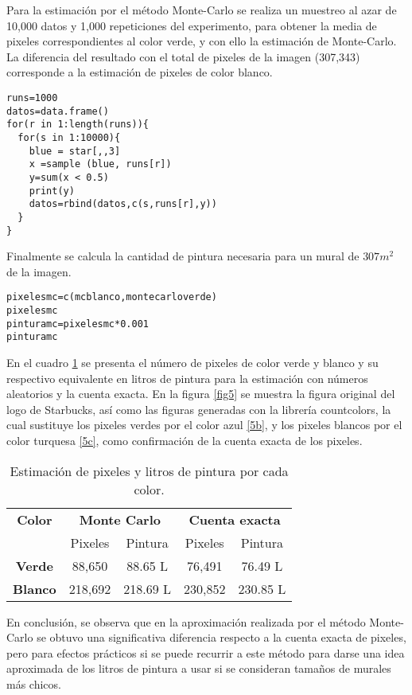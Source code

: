 \documentclass[12pt]{amsart}
\begin{document}
\newpage
Para la estimación por el método Monte-Carlo se realiza un muestreo al azar de 10,000 datos y 1,000 repeticiones del experimento, para obtener la media de pixeles correspondientes al color verde, y con ello la estimación de Monte-Carlo. La diferencia del resultado con el total de pixeles de la imagen (307,343) corresponde a la estimación de pixeles de color blanco.
\renewcommand{\listingscaption}{Código}
\begin{listing}[H]
  \begin{verbatim}
runs=1000
datos=data.frame()
for(r in 1:length(runs)){
  for(s in 1:10000){
    blue = star[,,3]
    x =sample (blue, runs[r])
    y=sum(x < 0.5)
    print(y)
    datos=rbind(datos,c(s,runs[r],y))
  }
}
  \end{verbatim}
  \label{codigo7}
\end{listing}
Finalmente se calcula la cantidad de pintura necesaria para un mural de $307m^{2}$ de la imagen.
\renewcommand{\listingscaption}{Código}
\begin{listing}[H]
  \begin{verbatim}
pixelesmc=c(mcblanco,montecarloverde)
pixelesmc
pinturamc=pixelesmc*0.001 
pinturamc
  \end{verbatim}
  \label{codigo7}
\end{listing}
En el cuadro \ref{cua1} se presenta el número de pixeles de color verde y blanco y su respectivo equivalente en litros de pintura para la estimación con números aleatorios y la cuenta exacta. En la figura \ref{fig5} se muestra la figura original del logo de Starbucks, así como las figuras generadas con la librería countcolors, la cual sustituye los pixeles verdes por el color azul \ref{5b}, y los pixeles blancos por el color turquesa \ref{5c}, como confirmación de la cuenta exacta de los pixeles.

\begin{table}[h]
\begin{center}
\caption{Estimación de pixeles y litros de pintura por cada color.}
\label{cua1}
\begin{tabular}{|c c c c c|}
\hline
\textbf{Color}&\multicolumn{2}{c}{\textbf{Monte Carlo}}&\multicolumn{2}{c}{\textbf{Cuenta exacta}}\\
 &Pixeles&Pintura&Pixeles&Pintura\\
\hline
\textbf{Verde}&88,650&88.65 L&76,491&76.49 L\\
\textbf{Blanco}&218,692&218.69 L&230,852&230.85 L\\
\hline
\end{tabular}
\end{center}
\end{table}
En conclusión, se observa que en la aproximación realizada por el método Monte-Carlo se obtuvo una significativa diferencia respecto a la cuenta exacta de pixeles, pero para efectos prácticos si se puede recurrir a este método para darse una idea aproximada de los litros de pintura a usar si se consideran tamaños de murales más chicos.
\clearpage


\end{document}
